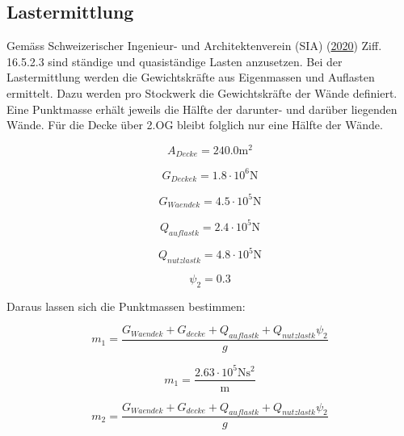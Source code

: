 \documentclass[
  letterpaper,
  DIV=11]{scrreprt}
\begin{document}
\hypertarget{lastermittlung}{%
\subsection{Lastermittlung}\label{lastermittlung}}

Gemäss Schweizerischer Ingenieur- und Architektenverein (SIA)
(\protect\hyperlink{ref-SIA261_2020}{2020}) Ziff. 16.5.2.3 sind ständige
und quasiständige Lasten anzusetzen. Bei der Lastermittlung werden die
Gewichtskräfte aus Eigenmassen und Auflasten ermittelt. Dazu werden pro
Stockwerk die Gewichtskräfte der Wände definiert. Eine Punktmasse erhält
jeweils die Hälfte der darunter- und darüber liegenden Wände. Für die
Decke über 2.OG bleibt folglich nur eine Hälfte der Wände.

\begin{equation}A_{Decke} = 240.0 \text{m}^{2}\end{equation}

\begin{equation}G_{Decke k} = 1.8 \cdot 10^{6} \text{N}\end{equation}

\begin{equation}G_{Waende k} = 4.5 \cdot 10^{5} \text{N}\end{equation}

\begin{equation}Q_{auflast k} = 2.4 \cdot 10^{5} \text{N}\end{equation}

\begin{equation}Q_{nutzlast k} = 4.8 \cdot 10^{5} \text{N}\end{equation}

\begin{equation}\psi_{2} = 0.3\end{equation}

Daraus lassen sich die Punktmassen bestimmen:

\begin{equation}m_{1} = \frac{G_{Waende k} + G_{decke} + Q_{auflast k} + Q_{nutzlast k} \psi_{2}}{g}\end{equation}

\begin{equation}m_{1} = \frac{2.63 \cdot 10^{5} \text{N} \text{s}^{2}}{\text{m}}\end{equation}

\begin{equation}m_{2} = \frac{G_{Waende k} + G_{decke} + Q_{auflast k} + Q_{nutzlast k} \psi_{2}}{g}\end{equation}
\end{document}
